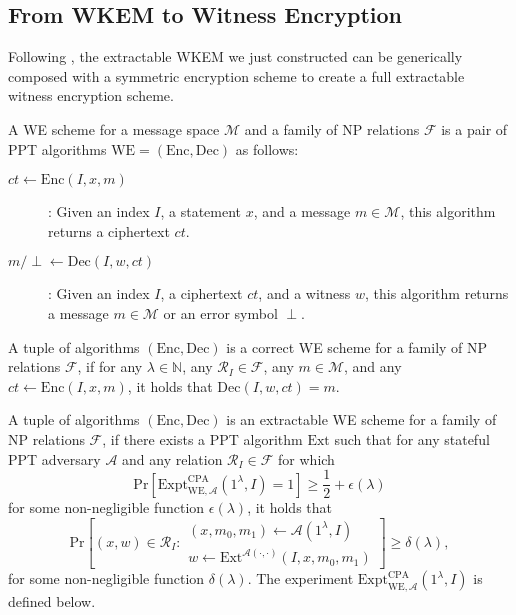 \subsection{From WKEM to Witness Encryption}
Following \textcite{fleischhacker2024extractable}, the extractable WKEM we just constructed can be generically composed with a symmetric encryption scheme to create a full extractable witness encryption scheme.

\begin{definition}
    A WE scheme for a message space $\mathcal{M}$ and a family of NP relations $\mathcal{F}$ is a pair of PPT algorithms $\text{WE} = (\text{Enc}, \text{Dec})$ as follows:
\end{definition}
\begin{description}
    \item[$ct \gets \text{Enc}(I, x, m)$]: Given an index $I$, a statement $x$, and a message $m \in \mathcal{M}$, this algorithm returns a ciphertext $ct$.
    \item[$m / \perp \gets \text{Dec}(I, w, ct)$]: Given an index $I$, a ciphertext $ct$, and a witness $w$, this algorithm returns a message $m \in \mathcal{M}$ or an error symbol $\perp$.
\end{description}

\begin{definition}[Correctness of WE]\label{def-WEcorr}
    A tuple of algorithms $(\text{Enc}, \text{Dec})$ is a correct WE scheme for a family of NP relations $\mathcal{F}$, if for any $\lambda \in \mathbb{N}$, any $\mathcal{R}_I \in \mathcal{F}$, any $m \in \mathcal{M}$, and any $ct \gets \text{Enc}(I, x, m)$, it holds that $\text{Dec}(I, w, ct) = m$.
\end{definition}

\begin{definition}[Extractability of WE]\label{def-WEextract}
    A tuple of algorithms $(\text{Enc}, \text{Dec})$ is an extractable WE scheme for a family of NP relations $\mathcal{F}$, if there exists a PPT algorithm $\text{Ext}$ such that for any stateful PPT
    adversary $\mathcal{A}$ and any relation $\mathcal{R}_I \in \mathcal{F}$ for which
    \begin{equation*}
        \text{Pr}[\text{Expt}^\text{CPA}_{\text{WE},\mathcal{A}}(1^\lambda, I) = 1] \geq \frac{1}{2} + \epsilon(\lambda)
    \end{equation*}
    for some non-negligible function $\epsilon(\lambda)$, it holds that
    \begin{equation*}
        \text{Pr}\left[
            (x, w) \in \mathcal{R}_I : 
            \begin{array}{r}
                (x, m_0, m_1) \gets \mathcal{A}(1^\lambda, I) \\
                w \gets \text{Ext}^{\mathcal{A}(\cdot, \cdot)}(I, x, m_0, m_1)
            \end{array}
        \right] \geq \delta(\lambda),
    \end{equation*}
    for some non-negligible function $\delta(\lambda)$. The experiment $\text{Expt}^\text{CPA}_{\text{WE},\mathcal{A}}(1^\lambda, I)$ is defined below.
\end{definition}

